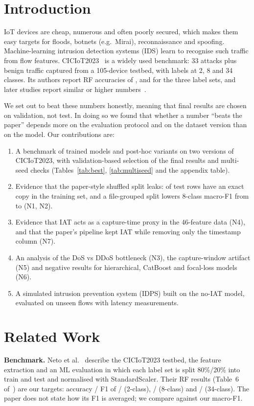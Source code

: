 \documentclass[conference]{IEEEtran}
\begin{document}
\section{Introduction}
IoT devices are cheap, numerous and often poorly secured, which makes them easy targets for floods, botnets
(e.g.\ Mirai), reconnaissance and spoofing. Machine-learning intrusion detection systems (IDS) learn to
recognise such traffic from flow features. CICIoT2023~\cite{neto2023ciciot} is a widely used benchmark: 33
attacks plus benign traffic captured from a 105-device testbed, with labels at 2, 8 and 34 classes. Its
authors report RF accuracies of \paperAccTwo{}, \paperAccEight{} and \paperAccThirtyFour{} for the three
label sets, and later studies report similar or higher numbers~\cite{gueriani2024cnnlstm,andrade2026dlids,bensaoud2025hybrid}.

We set out to beat these numbers honestly, meaning that final results are chosen on validation, not test. In doing
so we found that whether a number ``beats the paper'' depends more on the evaluation protocol and on the
dataset version than on the model. Our contributions are:
\begin{enumerate}
\item A benchmark of \nModels{} trained models and \nPosthoc{} post-hoc variants on two versions of CICIoT2023, with
validation-based selection of the final results and multi-seed checks (Tables~\ref{tab:best}, \ref{tab:multiseed} and the
appendix table).
\item Evidence that the paper-style shuffled split leaks: \nOneTwin{} of test rows have an exact copy in the
training set, and a file-grouped split lowers 8-class macro-F1 from \nTwoAMf{} to \nTwoCMf{} (N1, N2).
\item Evidence that IAT acts as a capture-time proxy in the 46-feature data (N4), and that the paper's
pipeline kept IAT while removing only the timestamp column (N7).
\item An analysis of the DoS vs DDoS bottleneck (N3), the capture-window artifact (N5) and negative results
for hierarchical, CatBoost and focal-loss models (N6).
\item A simulated intrusion prevention system (IDPS) built on the no-IAT model, evaluated on
\idsRows{} unseen flows with latency measurements.
\end{enumerate}

\section{Related Work}
\textbf{Benchmark.} Neto et al.~\cite{neto2023ciciot} describe the CICIoT2023 testbed, the feature extraction
and an ML evaluation in which each label set is split 80\%/20\% into train and test and normalised with
StandardScaler. Their RF results (Table~6 of~\cite{neto2023ciciot}) are our targets: accuracy / F1 of
\paperAccTwo{} / \paperMfTwo{} (2-class), \paperAccEight{} / \paperMfEight{} (8-class) and
\paperAccThirtyFour{} / \paperMfThirtyFour{} (34-class). The paper does not state how its F1 is averaged; we
compare against our macro-F1.
\end{document}
